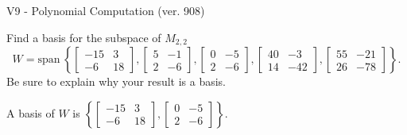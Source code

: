 \begin{exercise}
  \begin{exerciseTitle}V9 - Polynomial Computation (ver. 908)\end{exerciseTitle}
  \begin{exerciseStatement}
    Find a basis for the subspace of \(M_{2,2}\) 
\[W=\mathrm{span}\ \left\{\left[\begin{array}{cc}
-15 & 3 \\
-6 & 18
\end{array}\right] , \left[\begin{array}{cc}
5 & -1 \\
2 & -6
\end{array}\right] , \left[\begin{array}{cc}
0 & -5 \\
2 & -6
\end{array}\right] , \left[\begin{array}{cc}
40 & -3 \\
14 & -42
\end{array}\right] , \left[\begin{array}{cc}
55 & -21 \\
26 & -78
\end{array}\right]\right\}.\]
 Be sure to explain why your result is a basis.


  \end{exerciseStatement}
  \begin{exerciseAnswer}
   A basis of \(W\) is  \(\left\{\left[\begin{array}{cc}
-15 & 3 \\
-6 & 18
\end{array}\right] , \left[\begin{array}{cc}
0 & -5 \\
2 & -6
\end{array}\right]\right\}\).
  


  \end{exerciseAnswer}
\end{exercise}